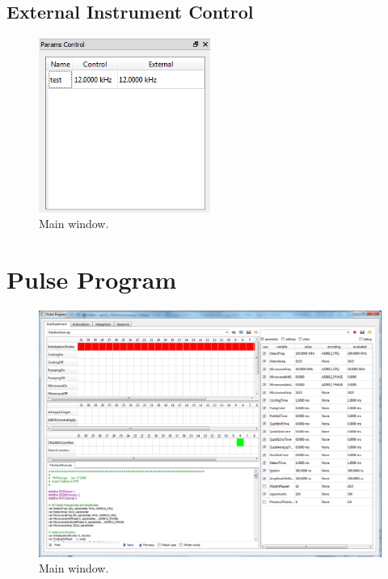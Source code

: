 \documentclass{scrartcl}
\begin{document}
\subsection{External Instrument Control}
\begin{figure}[htbp]
\begin{center}
\includegraphics[width=0.5\textwidth]{ParamsControl}
\end{center}
\caption{\label{GlobalVariables} Main window.}
\end{figure}

\section{Pulse Program}
\begin{figure}[htbp]
\begin{center}
\includegraphics[width=\textwidth]{PulseProgram}
\end{center}
\caption{\label{PulseProgram} Main window.}
\end{figure}
\end{document}
